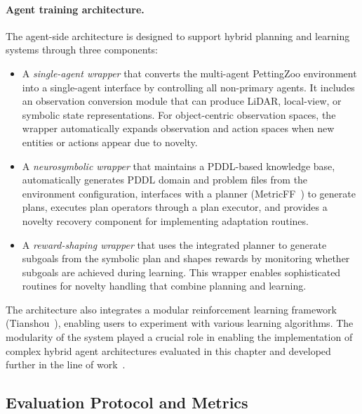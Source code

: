 \paragraph{Agent training architecture.} The agent-side architecture is designed to support hybrid planning and learning systems through three components:
\begin{itemize}[leftmargin=*]
    \item A \emph{single-agent wrapper} that converts the multi-agent PettingZoo environment into a single-agent interface by controlling all non-primary agents. It includes an observation conversion module that can produce LiDAR, local-view, or symbolic state representations. For object-centric observation spaces, the wrapper automatically expands observation and action spaces when new entities or actions appear due to novelty.
    \item A \emph{neurosymbolic wrapper} that maintains a PDDL-based knowledge base, automatically generates PDDL domain and problem files from the environment configuration, interfaces with a planner (MetricFF~\citep{hoffmann2003metricff}) to generate plans, executes plan operators through a plan executor, and provides a novelty recovery component for implementing adaptation routines.
    \item A \emph{reward-shaping wrapper} that uses the integrated planner to generate subgoals from the symbolic plan and shapes rewards by monitoring whether subgoals are achieved during learning. This wrapper enables sophisticated routines for novelty handling that combine planning and learning.
\end{itemize}

The architecture also integrates a modular reinforcement learning framework (Tianshou~\citep{weng2022tianshou}), enabling users to experiment with various learning algorithms. The modularity of the system played a crucial role in enabling the implementation of complex hybrid agent architectures evaluated in this chapter and developed further in the \RAPidLearn{} line of work~\citep{goel2022rapidlearn}.


\subsection{Evaluation Protocol and Metrics}
\label{sec:ng_evaluation}

